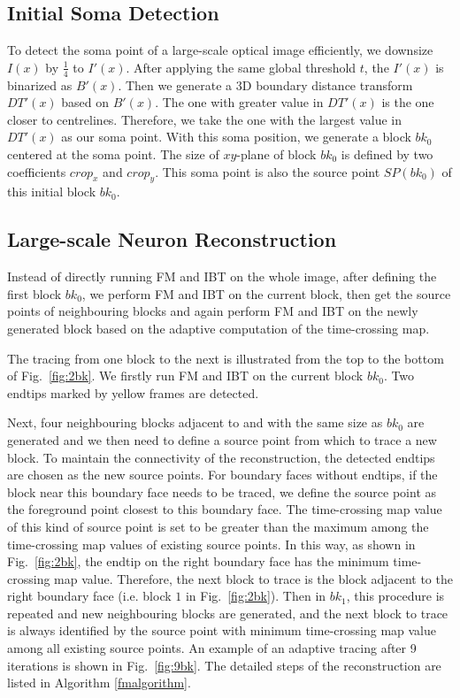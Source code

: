 \documentclass[conference]{IEEEtran}
\begin{document}
\subsection{Initial Soma Detection}
\label{ssec:subhead}
To detect the soma point of a large-scale optical image efficiently, we downsize $I(x)$ by $\frac{1}{4}$ to $I'(x)$. After applying the same global threshold $t$, the $I'(x)$ is binarized as $B'(x)$. Then we generate a 3D boundary distance transform $DT'(x)$ based on $B'(x)$. The one with greater value in $DT'(x)$ is the one closer to centrelines. Therefore, we take the one with the largest value in $DT'(x)$ as our soma point. With this soma position, we generate a block $bk_0$ centered at the soma point. The size of $xy$-plane of block $bk_0$ is defined by two coefficients $crop_x$ and $crop_y$. This soma point is also the source point $SP(bk_0)$ of this initial block $bk_0$.


\subsection{Large-scale Neuron Reconstruction}
\label{ssec:core}

Instead of directly running FM and IBT on the whole image, after defining the first block $bk_0$, we perform FM and IBT on the current block, then get the source points of neighbouring blocks and again perform FM and IBT on the newly generated block based on the adaptive computation of the time-crossing map.

The tracing from one block to the next is illustrated from the top to the bottom of Fig.~\ref{fig:2bk}. We firstly run FM and IBT on the current block $bk_0$. Two endtips marked by yellow frames are detected. 

Next, four neighbouring blocks adjacent to and with the same size as $bk_0$ are generated and we then need to define a source point from which to trace a new block. To maintain the connectivity of the reconstruction, the detected endtips are chosen as the new source points. For boundary faces without endtips, if the block near this boundary face needs to be traced, we define the source point as the foreground point closest to this boundary face. The time-crossing map value of this kind of source point is set to be greater than the maximum among the time-crossing map values of existing source points. In this way, as shown in Fig.~\ref{fig:2bk}, the endtip on the right boundary face has the minimum time-crossing map value. Therefore, the next block to trace is the block adjacent to the right boundary face (i.e. block $1$ in Fig.~\ref{fig:2bk}). Then in $bk_1$, this procedure is repeated and new neighbouring blocks are generated, and the next block to trace is always identified by the source point with minimum time-crossing map value among all existing source points. An example of an adaptive tracing after 9 iterations is shown in Fig.~\ref{fig:9bk}. The detailed steps of the reconstruction are listed in Algorithm \ref{fmalgorithm}. 
\end{document}
